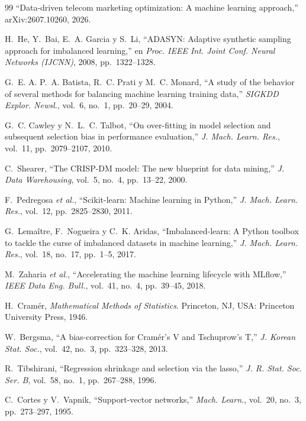 \documentclass[conference]{IEEEtran}
\begin{document}
\begin{thebibliography}{99}
``Data-driven telecom marketing optimization: A machine learning approach,'' arXiv:2607.10260, 2026.

H.~He, Y.~Bai, E.~A. Garcia y S.~Li, ``ADASYN: Adaptive synthetic sampling approach for imbalanced learning,'' en \emph{Proc. IEEE Int. Joint Conf. Neural Networks (IJCNN)}, 2008, pp.~1322--1328.

G.~E. A. P.~A. Batista, R.~C. Prati y M.~C. Monard, ``A study of the behavior of several methods for balancing machine learning training data,'' \emph{SIGKDD Explor. Newsl.}, vol.~6, no.~1, pp.~20--29, 2004.

G.~C. Cawley y N.~L.~C. Talbot, ``On over-fitting in model selection and subsequent selection bias in performance evaluation,'' \emph{J. Mach. Learn. Res.}, vol.~11, pp.~2079--2107, 2010.

C.~Shearer, ``The CRISP-DM model: The new blueprint for data mining,'' \emph{J. Data Warehousing}, vol.~5, no.~4, pp.~13--22, 2000.

F.~Pedregosa \emph{et al.}, ``Scikit-learn: Machine learning in Python,'' \emph{J. Mach. Learn. Res.}, vol.~12, pp.~2825--2830, 2011.

G.~Lemaître, F.~Nogueira y C.~K. Aridas, ``Imbalanced-learn: A Python toolbox to tackle the curse of imbalanced datasets in machine learning,'' \emph{J. Mach. Learn. Res.}, vol.~18, no.~17, pp.~1--5, 2017.

M.~Zaharia \emph{et al.}, ``Accelerating the machine learning lifecycle with MLflow,'' \emph{IEEE Data Eng. Bull.}, vol.~41, no.~4, pp.~39--45, 2018.

H.~Cramér, \emph{Mathematical Methods of Statistics}. Princeton, NJ, USA: Princeton University Press, 1946.

W.~Bergsma, ``A bias-correction for Cramér's V and Tschuprow's T,'' \emph{J. Korean Stat. Soc.}, vol.~42, no.~3, pp.~323--328, 2013.

R.~Tibshirani, ``Regression shrinkage and selection via the lasso,'' \emph{J. R. Stat. Soc. Ser. B}, vol.~58, no.~1, pp.~267--288, 1996.

C.~Cortes y V.~Vapnik, ``Support-vector networks,'' \emph{Mach. Learn.}, vol.~20, no.~3, pp.~273--297, 1995.


\end{thebibliography}
\end{document}
